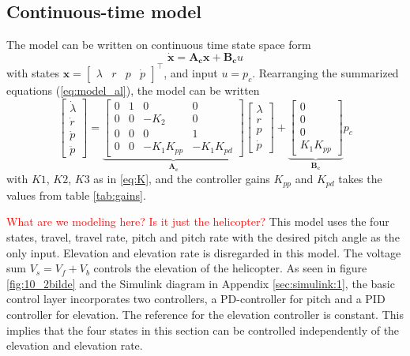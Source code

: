 \documentclass[11pt,a4paper,USenglish]{article} %
\begin{document}
\subsection{Continuous-time model}
The model can be written on continuous time state space form
\begin{equation}
    \mathbf{\dot{x}} = \mathbf{A_cx} + \mathbf{B_c} u
    \label{eq:axbu}
\end{equation}
with states $\mathbf{x} = \begin{bmatrix} \lambda & r & p & \dot{p} \end{bmatrix}^\top$, and input $u = p_c$. Rearranging the summarized equations (\ref{eq:model_al}), the model can be written
\begin{equation}
	\begin{bmatrix}
    \dot{\lambda}\\ \dot{r} \\ \dot{p} \\ \ddot{p}
    \end{bmatrix}
    = \underbrace{\begin{bmatrix} 0 & 1 & 0 & 0 \\ 0 & 0 & -K_2 & 0 \\ 0 & 0 & 0 & 1 \\ 0 & 0 & -K_1K_{pp} & -K_1K_{pd} \end{bmatrix}}_{\mathbf{A_{c}}}
    \begin{bmatrix} \lambda \\ r\\ p\\ \dot{p}
    \end{bmatrix}
    +\underbrace{\begin{bmatrix}0 \\ 0 \\ 0 \\K_1K_{pp} \end{bmatrix}}_\mathbf{{B_{c}}}
    p_{c}
\end{equation}
with $K1$, $K2$, $K3$ as in \eqref{eq:K}, and the controller gains $K_{pp}$ and $K_{pd}$ takes the values from table \eqref{tab:gains}.
\newline

\textcolor{red}{What are we modeling here? Is it just the helicopter?}
This model uses the four states, travel, travel rate, pitch and pitch rate with the desired pitch angle as the only input. Elevation and elevation rate is disregarded in this model. The voltage sum $V_s = V_f + V_b$ controls the elevation of the helicopter. As seen in figure \eqref{fig:10_2bilde} and the Simulink diagram in Appendix \ref{sec:simulink:1}, the basic control layer incorporates two controllers, a PD-controller for pitch and a PID controller for elevation. The reference for the elevation controller is constant. This implies that the four states in this section can be controlled independently of the elevation and elevation rate.
\end{document}
